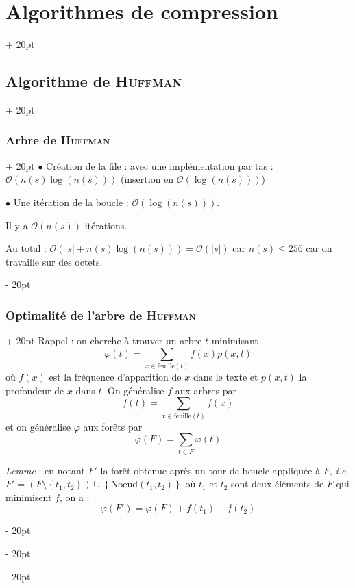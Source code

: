 \documentclass[a4paper, 12pt, twoside]{article}
\newcommand{\lr}[1]{\left( #1 \right)}
\newcommand{\set}[1]{\left\{ #1 \right\}}
\newcommand{\abs}[1]{\left\lvert #1 \right\rvert}
\renewcommand{\le}{\leqslant}
\newcommand{\ind}[1][20pt]{\advance\leftskip + #1}
\newcommand{\deind}[1][20pt]{\advance\leftskip - #1}
\newenvironment{indt}[2][20pt]{#2 \par \ind[#1]}{\par \deind} %
\begin{document}
\begin{indt}{\section{Algorithmes de compression}}
\begin{indt}{\subsection{Algorithme de \textsc{Huffman}}}
\begin{indt}{\subsubsection{Arbre de \textsc{Huffman}}}
                $\bullet$ Création de la file : avec une implémentation par tas : $\mathcal O\!\lr{n(s) \log(n(s))}$ (insertion en $\mathcal O(\log(n(s)))$)

                $\bullet$ Une itération de la boucle : $\mathcal O(\log(n(s)))$.

                Il y a $\mathcal O(n(s))$ itérations.

                Au total : $\mathcal O(\abs s + n(s)\log(n(s))) = \mathcal O(\abs s)$ car $n(s) \le 256$ car on travaille sur des octets.
            \end{indt}

            \vspace{12pt}
            
            \begin{indt}{\subsubsection{Optimalité de l'arbre de \textsc{Huffman}}}
                Rappel : on cherche à trouver un arbre $t$ minimisant
                \[
                    \varphi(t) = \displaystyle \sum_{x \in \mathrm{feuille}(t)} f(x) p(x, t)
                \]
                où $f(x)$ est la fréquence d'apparition de $x$ dans le texte et $p(x, t)$ la profondeur de $x$ dans $t$.
                On généralise $f$ aux arbres par
                \[
                    f(t) = \sum_{x \in \mathrm{feuille}(t)} f(x)
                \]
                et on généralise $\varphi$ aux forêts par
                \[
                    \varphi(F) = \sum_{t \in F} \varphi(t)
                \]

                \vspace{6pt}
                
                \begin{pseudocode}
                    \textit{Lemme} :
                    en notant $F'$ la forêt obtenue après un tour de boucle appliquée à $F$, \textit{i.e}
                    $F' = (F \setminus \set{t_1, t_2}) \cup \set{\mathrm{Noeud}(t_1, t_2)}$
                    où $t_1$ et $t_2$ sont deux éléments de $F$ qui minimisent $f$, on a :
                    \[
                        \varphi(F') = \varphi(F) + f(t_1) + f(t_2)
                    \]
                \end{pseudocode}

                \vspace{12pt}
                

\end{indt}
\end{indt}
\end{indt}
\end{document}
